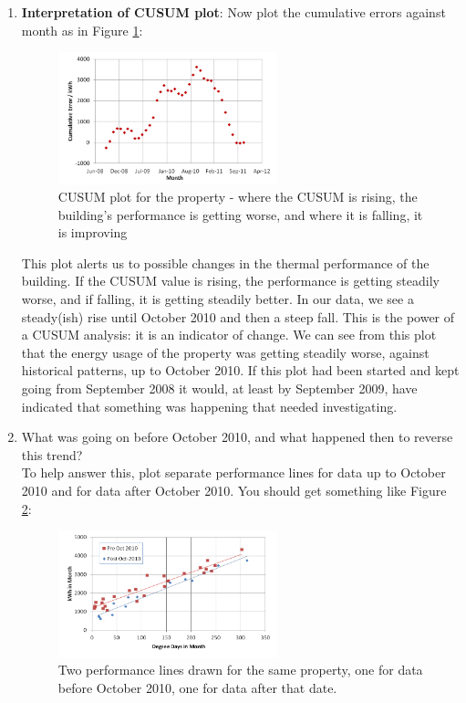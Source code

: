 \documentclass{article}
\begin{document}
\begin{enumerate}
\item \textbf{Interpretation of CUSUM plot}: Now plot the cumulative errors against month as in Figure \ref{fig:CUSUM_plot}:

\begin{figure}
\includegraphics[width=0.6\textwidth]{CUSUM_plot}
\caption{CUSUM plot for the property - where the CUSUM is rising, the building's performance is getting worse, and where it is falling, it is improving}
\label{fig:CUSUM_plot}
\end{figure}

{\color{OliveGreen}This plot alerts us to possible changes in the thermal performance of the building. If the CUSUM value is rising, the performance is getting steadily worse, and if falling, it is getting steadily better. In our data, we see a steady(ish) rise until October 2010 and then a steep fall. This is the power of a CUSUM analysis: it is an indicator of change. We can see from this plot that the energy usage of the property was getting steadily worse, against historical patterns, up to October 2010. If this plot had been started and kept going from September 2008 it would, at least by September 2009, have indicated that something was happening that needed investigating. 
}

\item What was going on before October 2010, and what happened then to reverse this trend?
\\To help answer this, plot separate performance lines for data up to October 2010 and for data after October 2010. You should get something like Figure \ref{fig:PrePost_Performance_Lines}:

\begin{figure}
\includegraphics[width=0.6\textwidth]{PrePost_Performance_Lines}
\caption{Two performance lines drawn for the same property, one for data before October 2010, one for data after that date.}
\label{fig:PrePost_Performance_Lines}
\end{figure}


\end{enumerate}
\end{document}
